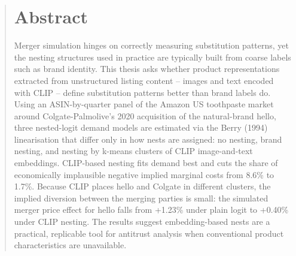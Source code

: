 \documentclass[a4paper,titlepage,liststotoc,final,twoside,openright,cleardoubleempty,BCOR12mm]{scrreprt}
\begin{document}
\begin{abstract}
\section*{Abstract}
Merger simulation hinges on correctly measuring substitution patterns, yet the
nesting structures used in practice are typically built from coarse labels such
as brand identity. This thesis asks whether product representations extracted
from unstructured listing content -- images and text encoded with CLIP -- define
substitution patterns better than brand labels do. Using an ASIN-by-quarter
panel of the Amazon US toothpaste market around Colgate-Palmolive's 2020
acquisition of the natural-brand hello, three nested-logit demand models are
estimated via the Berry (1994) linearisation that differ only in how nests are
assigned: no nesting, brand nesting, and nesting by k-means clusters of CLIP
image-and-text embeddings. CLIP-based nesting fits demand best and cuts the
share of economically implausible negative implied marginal costs from 8.6\% to
1.7\%. Because CLIP places hello and Colgate in different clusters, the implied
diversion between the merging parties is small: the simulated merger price
effect for hello falls from +1.23\% under plain logit to +0.40\% under CLIP
nesting. The results suggest embedding-based nests are a practical, replicable
tool for antitrust analysis when conventional product characteristics are
unavailable.

\begin{otherlanguage}{ngerman}

\end{otherlanguage}
\end{abstract}
\end{document}
